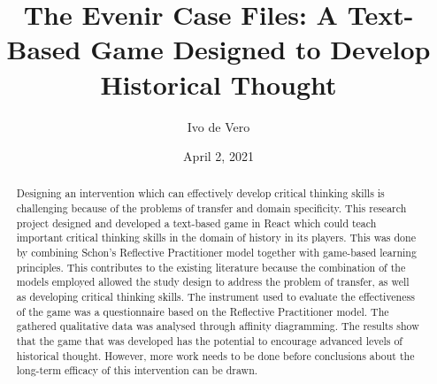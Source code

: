 \documentclass{l4proj}
\begin{document}
\title{The Evenir Case Files: A Text-Based Game Designed to Develop Historical Thought}
\author{Ivo de Vero}
\date{April 2, 2021}

\maketitle

\begin{abstract}
    
    Designing an intervention which can effectively develop critical thinking skills is challenging because of the problems of transfer and domain specificity. This research project designed and developed a text-based game in React which could teach important critical thinking skills in the domain of history in its players. This was done by combining Schon's Reflective Practitioner model together with game-based learning principles. This contributes to the existing literature because the combination of the models employed allowed the study design to address the problem of transfer, as well as developing critical thinking skills. The instrument used to evaluate the effectiveness of the game was a questionnaire based on the Reflective Practitioner model. The gathered qualitative data was analysed through affinity diagramming. The results show that the game that was developed has the potential to encourage advanced levels of historical thought. However, more work needs to be done before conclusions about the long-term efficacy of this intervention can be drawn. 
\end{abstract}

%
%
\end{document}
